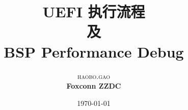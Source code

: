\documentclass [a4paper,12pt,oneside] {report}
\begin{document}
\title{\textbf{UEFI 执行流程}\\ %
及 \\BSP Performance Debug} %

\author{\textsc{haobo.gao} %
\\{\textbf{Foxconn ZZDC}}} %

\date{\today} %
\maketitle


\tableofcontents
\newpage
{}


\end{document}
